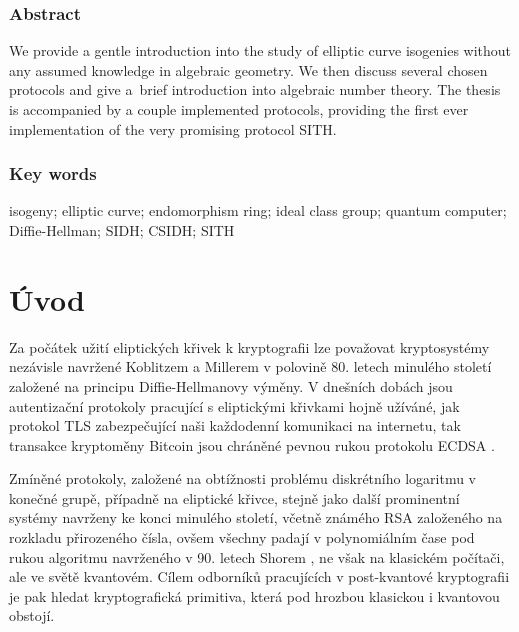 \documentclass[12pt]{report}
\begin{document}
\vspace*{4cm}

\subsection*{Abstract}
We provide a gentle introduction into the study of elliptic curve isogenies without any assumed knowledge in algebraic geometry. We then discuss several chosen protocols and give a~brief introduction into algebraic number theory. The thesis is accompanied by a couple implemented protocols, providing the first ever implementation of the very promising protocol SITH.

\subsection*{Key words}
isogeny; elliptic curve; endomorphism ring; ideal class group; quantum computer; Diffie-Hellman; SIDH; CSIDH; SITH





{
\hypersetup{linkcolor=black}
\tableofcontents
}
\thispagestyle{empty}

\chapter*{Úvod}

Za počátek užití eliptických křivek k kryptografii lze považovat kryptosystémy nezávisle navržené Koblitzem \cite{Koblitz} a Millerem \cite{Miller} v polovině 80. letech minulého století založené na principu Diffie-Hellmanovy \cite{Diffie} výměny. V dnešních dobách jsou autentizační protokoly pracující s eliptickými křivkami hojně užíváné, jak protokol TLS zabezpečující naši každodenní komunikaci na internetu, tak transakce kryptoměny Bitcoin jsou chráněné pevnou rukou protokolu ECDSA \cite{ECDSA}.

Zmíněné protokoly, založené na obtížnosti problému diskrétního logaritmu v konečné grupě, případně na eliptické křivce, stejně jako další prominentní systémy navrženy ke konci minulého století, včetně  známého RSA \cite{RSA} založeného na rozkladu přirozeného čísla, ovšem všechny padají v polynomiálním čase pod rukou algoritmu navrženého v 90. letech Shorem \cite{Shor}, ne však na klasickém počítači, ale ve světě kvantovém. Cílem odborníků pracujících v post-kvantové kryptografii je pak hledat kryptografická primitiva, která pod hrozbou klasickou i kvantovou obstojí.
\end{document}
